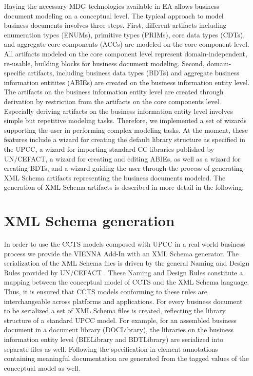 \documentclass{acm_proc_article-sp}
\begin{document}
Having the necessary MDG technologies available in EA allows business document modeling on a conceptual level. The typical approach to model business documents involves three steps. First, different artifacts including enumeration types (ENUMs), primitive types (PRIMs), core data types (CDTs), and aggregate core components (ACCs) are modeled on the core component level. All artifacts modeled on the core component level represent domain-independent, re-usable, building blocks for business document modeling. Second, domain-specific artifacts, including business data types (BDTs) and aggregate business information entitites (ABIEs) are created on the business information entity level. The artifacts on the business information entity level are created through derivation by restriction from the artifacts on the core components level. \\ Especially deriving artifacts on the business information entity level involves simple but repetitive modeling tasks. Therefore, we implemented a set of wizards supporting the user in performing complex modeling tasks. At the moment, these features include a wizard for creating the default library structure as specified in the UPCC, a wizard for importing standard CC libraries published by UN/CEFACT, a wizard for creating and editing ABIEs, as well as a wizard for creating BDTs, and a wizard guiding the user through the process of generating XML Schema artifacts representing the business documents modeled. The generation of XML Schema artifacts is described in more detail in the following. 

\section{XML Schema generation}
In order to use the CCTS models composed with UPCC in a real world business process we provide the VIENNA Add-In with an XML Schema generator. The serialization of the XML Schema files is driven by the general Naming and Design Rules provided by UN/CEFACT \cite{CEFACT:NDR}. These Naming and Design Rules constitute a mapping between the conceptual model of CCTS and the XML Schema language. Thus, it is ensured that CCTS models conforming to these rules are interchangeable across platforms and applications. For every business document to be serialized a set of XML Schema files is created, reflecting the library structure of a standard UPCC model. For example, for an assembled business document in a document library (DOCLibrary), the libraries on the business information entity level (BIELibrary and BDTLibrary) are serialized into separate files as well. Following the specification in \cite{CEFACT:NDR} element annotations containing meaningful documentation are generated from the tagged values of the conceptual model as well. 
\end{document}
